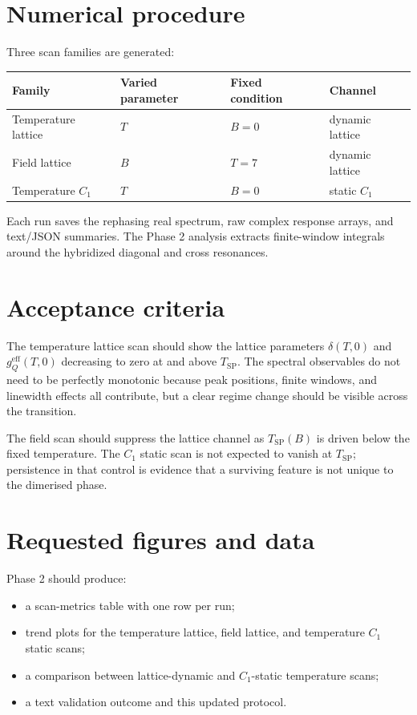 \documentclass[11pt]{article}
\begin{document}
\section{Numerical procedure}
Three scan families are generated:
\begin{center}
\begin{tabular}{llll}
\toprule
Family & Varied parameter & Fixed condition & Channel \\
\midrule
Temperature lattice & $T$ & $B=0$ & dynamic lattice \\
Field lattice & $B$ & $T=7$ & dynamic lattice \\
Temperature $C_1$ & $T$ & $B=0$ & static $C_1$ \\
\bottomrule
\end{tabular}
\end{center}
Each run saves the rephasing real spectrum, raw complex response arrays, and
text/JSON summaries.  The Phase 2 analysis extracts finite-window integrals
around the hybridized diagonal and cross resonances.

\section{Acceptance criteria}
The temperature lattice scan should show the lattice parameters
$\delta(T,0)$ and $g_Q^{\mathrm{eff}}(T,0)$ decreasing to zero at and above
$T_{\mathrm{SP}}$.  The spectral observables do not need to be perfectly
monotonic because peak positions, finite windows, and linewidth effects all
contribute, but a clear regime change should be visible across the transition.

The field scan should suppress the lattice channel as $T_{\mathrm{SP}}(B)$ is
driven below the fixed temperature.  The $C_1$ static scan is not expected to
vanish at $T_{\mathrm{SP}}$; persistence in that control is evidence that a
surviving feature is not unique to the dimerised phase.

\section{Requested figures and data}
Phase 2 should produce:
\begin{itemize}
\item a scan-metrics table with one row per run;
\item trend plots for the temperature lattice, field lattice, and temperature
$C_1$ static scans;
\item a comparison between lattice-dynamic and $C_1$-static temperature scans;
\item a text validation outcome and this updated protocol.
\end{itemize}
\end{document}
